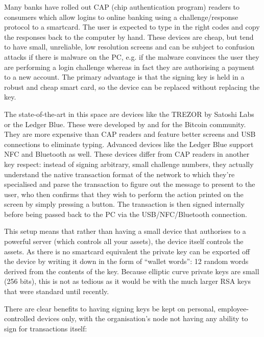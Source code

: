 \documentclass{article}
\begin{document}
Many banks have rolled out CAP (chip authentication program) readers to consumers which allow logins to online
banking using a challenge/response protocol to a smartcard. The user is expected to type in the right codes and
copy the responses back to the computer by hand. These devices are cheap, but tend to have small, unreliable, low
resolution screens and can be subject to confusion attacks if there is malware on the PC, e.g. if the malware
convinces the user they are performing a login challenge whereas in fact they are authorising a payment to a new
account. The primary advantage is that the signing key is held in a robust and cheap smart card, so the device can
be replaced without replacing the key.

The state-of-the-art in this space are devices like the TREZOR\cite{TREZOR} by Satoshi Labs or the Ledger Blue.
These were developed by and for the Bitcoin community. They are more expensive than CAP readers and feature better
screens and USB connections to eliminate typing. Advanced devices like the Ledger Blue support NFC and Bluetooth as
well. These devices differ from CAP readers in another key respect: instead of signing arbitrary, small challenge
numbers, they actually understand the native transaction format of the network to which they're specialised and
parse the transaction to figure out the message to present to the user, who then confirms that they wish to perform
the action printed on the screen by simply pressing a button. The transaction is then signed internally before
being passed back to the PC via the USB/NFC/Bluetooth connection.

This setup means that rather than having a small device that authorises to a powerful server (which controls all
your assets), the device itself controls the assets. As there is no smartcard equivalent the private key can be
exported off the device by writing it down in the form of ``wallet words'': 12 random words derived from the
contents of the key. Because elliptic curve private keys are small (256 bits), this is not as tedious as it would
be with the much larger RSA keys that were standard until recently.

There are clear benefits to having signing keys be kept on personal, employee-controlled devices only, with the
organisation's node not having any ability to sign for transactions itself:
\end{document}
